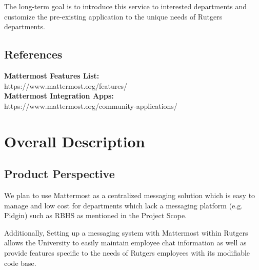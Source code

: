 \documentclass{scrreprt}
\begin{document}
The long-term goal is to introduce this service to interested departments and
customize the pre-existing application to the unique needs of Rutgers
departments.

\section{References}

\noindent
\textbf{Mattermost Features List:}\\
https://www.mattermost.org/features/\\

\noindent
\textbf{Mattermost Integration Apps:}\\
https://www.mattermost.org/community-applications/\\


\chapter{Overall Description}

\section{Product Perspective}


We plan to use Mattermost as a centralized messaging solution which is easy to
manage and low cost for departments which lack a messaging platform (e.g.
Pidgin) such as RBHS as mentioned in the Project Scope.

Additionally, Setting up a messaging system with Mattermost within Rutgers allows the
University to easily maintain employee chat information as well as provide
features specific to the needs of Rutgers employees with its modifiable code
base.\\
\end{document}
